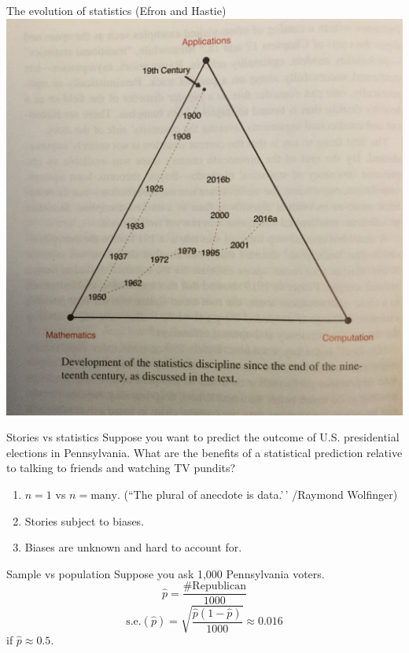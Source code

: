 \documentclass[
  ignorenonframetext,
  aspectratio=1610,
]{beamer}
\providecommand{\tightlist}{%
  \setlength{\itemsep}{0pt}\setlength{\parskip}{0pt}}
\begin{document}
\begin{frame}{The evolution of statistics (Efron and Hastie)}
\protect\hypertarget{the-evolution-of-statistics-efron-and-hastie}{}
\includegraphics{exhibit/efron-hastie.jpg}
\end{frame}

\begin{frame}{Stories vs statistics}
\protect\hypertarget{stories-vs-statistics}{}
Suppose you want to predict the outcome of U.S. presidential elections
in Pennsylvania. What are the benefits of a statistical prediction
relative to talking to friends and watching TV pundits?

\begin{enumerate}
\tightlist
\item
  \(n=1\) vs \(n=\text{many}\). (``The plural of anecdote is data.'\,'
  /Raymond Wolfinger)
\item
  Stories subject to biases.
\item
  Biases are unknown and hard to account for.
\end{enumerate}
\end{frame}

\begin{frame}{Sample vs population}
\protect\hypertarget{sample-vs-population}{}
Suppose you ask 1,000 Pennsylvania voters. \[
\hat p = \frac {\# \text{Republican}}{1000}
\] \[
\text{s.e.}(\hat p) = \sqrt{\frac {\hat p (1-\hat p)}{1000}} \approx 0.016
\] if \(\hat p\approx 0.5\).
\end{frame}
\end{document}
